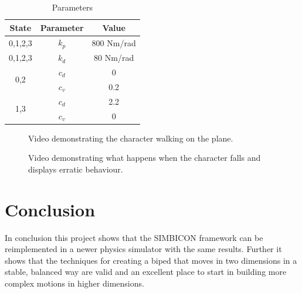 \documentclass[12pt, a4paper]{article}
\begin{document}
\begin{table}[ht]
\caption{Parameters}
\begin{center}
\begin{tabular}{|c|c|c|}
\hline
State & Parameter & Value \\
\hline
0,1,2,3 & $k_p$ & 800 Nm/rad\\
\hline
0,1,2,3 & $k_d$ & 80 Nm/rad\\
\hline
\multirow{2}{*}{0,2}& $c_d$ & 0\\\cline{2-3}
& $c_v$ & 0.2\\ \cline{2-3}
\hline
\multirow{2}{*}{1,3}& $c_d$ & 2.2\\\cline{2-3}
& $c_v$ & 0\\ \cline{2-3}
\hline
\end{tabular}
\end{center}
\label{tbl:parameters}
\end{table}


\begin{figure}
\begin{center}
\caption{Video demonstrating the character walking on the plane.}\label{vid: character walking}
\end{center}
\end{figure}



\begin{figure}
\begin{center}
\caption{Video demonstrating what happens when the character falls and displays erratic behaviour.}\label{vid: character falling}
\end{center}
\end{figure}

\section{Conclusion}

In conclusion this project shows that the SIMBICON framework can be reimplemented in a newer physics simulator with the same results. Further it shows that the techniques for creating a biped that moves in two dimensions in a stable, balanced way are valid and an excellent place to start in building more complex motions in higher dimensions. 
 
\end{document}
